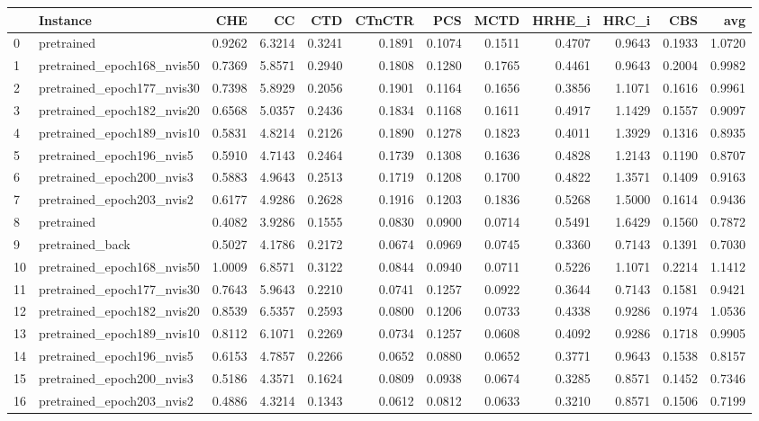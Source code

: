 \begin{tabular}{llrrrrrrrrrr}
\toprule
 & Instance & CHE & CC & CTD & CTnCTR & PCS & MCTD & HRHE_i & HRC_i & CBS & avg \\
\midrule
0 & pretrained & 0.9262 & 6.3214 & 0.3241 & 0.1891 & 0.1074 & 0.1511 & 0.4707 & 0.9643 & 0.1933 & 1.0720 \\
1 & pretrained_epoch168_nvis50 & 0.7369 & 5.8571 & 0.2940 & 0.1808 & 0.1280 & 0.1765 & 0.4461 & 0.9643 & 0.2004 & 0.9982 \\
2 & pretrained_epoch177_nvis30 & 0.7398 & 5.8929 & 0.2056 & 0.1901 & 0.1164 & 0.1656 & 0.3856 & 1.1071 & 0.1616 & 0.9961 \\
3 & pretrained_epoch182_nvis20 & 0.6568 & 5.0357 & 0.2436 & 0.1834 & 0.1168 & 0.1611 & 0.4917 & 1.1429 & 0.1557 & 0.9097 \\
4 & pretrained_epoch189_nvis10 & 0.5831 & 4.8214 & 0.2126 & 0.1890 & 0.1278 & 0.1823 & 0.4011 & 1.3929 & 0.1316 & 0.8935 \\
5 & pretrained_epoch196_nvis5 & 0.5910 & 4.7143 & 0.2464 & 0.1739 & 0.1308 & 0.1636 & 0.4828 & 1.2143 & 0.1190 & 0.8707 \\
6 & pretrained_epoch200_nvis3 & 0.5883 & 4.9643 & 0.2513 & 0.1719 & 0.1208 & 0.1700 & 0.4822 & 1.3571 & 0.1409 & 0.9163 \\
7 & pretrained_epoch203_nvis2 & 0.6177 & 4.9286 & 0.2628 & 0.1916 & 0.1203 & 0.1836 & 0.5268 & 1.5000 & 0.1614 & 0.9436 \\
8 & pretrained & 0.4082 & 3.9286 & 0.1555 & 0.0830 & 0.0900 & 0.0714 & 0.5491 & 1.6429 & 0.1560 & 0.7872 \\
9 & pretrained_back & 0.5027 & 4.1786 & 0.2172 & 0.0674 & 0.0969 & 0.0745 & 0.3360 & 0.7143 & 0.1391 & 0.7030 \\
10 & pretrained_epoch168_nvis50 & 1.0009 & 6.8571 & 0.3122 & 0.0844 & 0.0940 & 0.0711 & 0.5226 & 1.1071 & 0.2214 & 1.1412 \\
11 & pretrained_epoch177_nvis30 & 0.7643 & 5.9643 & 0.2210 & 0.0741 & 0.1257 & 0.0922 & 0.3644 & 0.7143 & 0.1581 & 0.9421 \\
12 & pretrained_epoch182_nvis20 & 0.8539 & 6.5357 & 0.2593 & 0.0800 & 0.1206 & 0.0733 & 0.4338 & 0.9286 & 0.1974 & 1.0536 \\
13 & pretrained_epoch189_nvis10 & 0.8112 & 6.1071 & 0.2269 & 0.0734 & 0.1257 & 0.0608 & 0.4092 & 0.9286 & 0.1718 & 0.9905 \\
14 & pretrained_epoch196_nvis5 & 0.6153 & 4.7857 & 0.2266 & 0.0652 & 0.0880 & 0.0652 & 0.3771 & 0.9643 & 0.1538 & 0.8157 \\
15 & pretrained_epoch200_nvis3 & 0.5186 & 4.3571 & 0.1624 & 0.0809 & 0.0938 & 0.0674 & 0.3285 & 0.8571 & 0.1452 & 0.7346 \\
16 & pretrained_epoch203_nvis2 & 0.4886 & 4.3214 & 0.1343 & 0.0612 & 0.0812 & 0.0633 & 0.3210 & 0.8571 & 0.1506 & 0.7199 \\
\bottomrule
\end{tabular}
